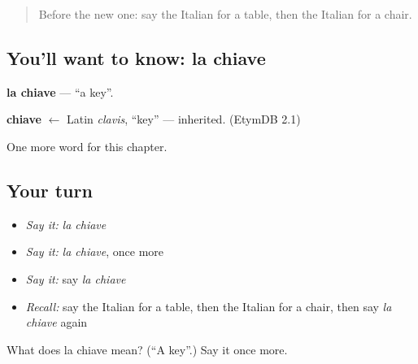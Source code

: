 \begin{quote}
Before the new one: say the Italian for a table, then the Italian for a chair.
\end{quote}

\subsection*{You'll want to know: la chiave}
\textbf{la chiave} — \textquotedblleft{}a key\textquotedblright{}.

\begin{cousinweb}
\textbf{chiave} $\leftarrow$ Latin \emph{clavis}, \textquotedblleft{}key\textquotedblright{} — inherited. (EtymDB 2.1)
\end{cousinweb}

\begin{grammarlens}[title={What you've built}]
One more word for this chapter.
\end{grammarlens}

\subsection*{Your turn}
\begin{itemize}
\raggedright
  \item \emph{Say it:} \emph{la chiave}
  \item \emph{Say it:} \emph{la chiave}, once more
  \item \emph{Say it:} say \emph{la chiave}
  \item \emph{Recall:} say the Italian for a table, then the Italian for a chair, then say \emph{la chiave} again
\end{itemize}

\begin{tcolorbox}[breakable,colback=teal!4,colframe=teal!35!black,title={Before you move on}]
What does la chiave mean? (\textquotedblleft{}A key\textquotedblright{}.) Say it once more.
\end{tcolorbox}

